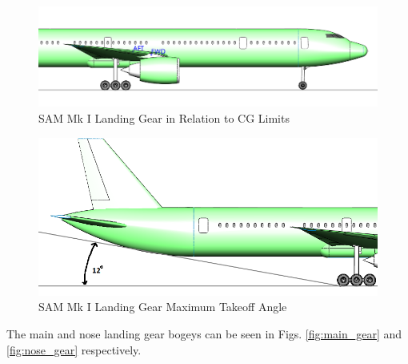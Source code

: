 \begin{figure}[!h]
    \centering
    \includegraphics[width=\linewidth]{Photos/landinggear/LG Close Side View with CG.PNG}
    \caption{SAM Mk I Landing Gear in Relation to CG Limits}
    \label{fig:landing_gear_CG}
\end{figure}
\begin{figure}[!h]
    \centering
    \includegraphics[width=\linewidth]{Photos/landinggear/Landing Gear Angle.PNG}
    \caption{SAM Mk I Landing Gear Maximum Takeoff Angle}
    \label{fig:gear_angle}
\end{figure}
\FloatBarrier
The main and nose landing gear bogeys can be seen in Figs. \ref{fig:main_gear} and \ref{fig:nose_gear} respectively. 

